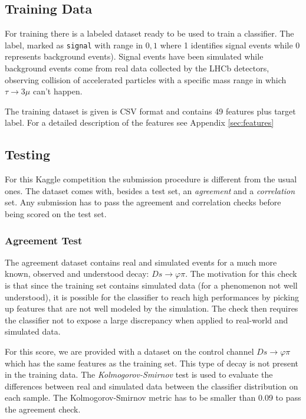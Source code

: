 \documentclass[conference]{IEEEtran}
\begin{document}
\subsection{Training Data}
For training there is a labeled dataset ready to be used to train a classifier.
The label, marked as \texttt{signal} with range in ${0,1}$ where 1 identifies
signal events while 0 represents background events). Signal events have been
simulated while background events come from real data collected by the LHCb
detectors, observing collision of accelerated particles with a specific mass
range in which $\tau \rightarrow 3\mu$ can't happen.

The training dataset is given is CSV format and contains 49 features plus target
label. For a detailed description of the features see Appendix \ref{sec:features}

\subsection{Testing}
For this Kaggle competition the submission procedure is different from the usual
ones. The dataset comes with, besides a test set, an \textit{agreement} and a
\textit{correlation} set. Any submission has to pass the agreement and
correlation checks before being scored on the test set.

\subsubsection{Agreement Test}
\label{sec:agreement}
The agreement dataset contains real and simulated events for a much more known,
observed and understood decay: $Ds \rightarrow \varphi\pi$. The motivation for
this check is that since the training set contains simulated data (for a
phenomenon not well understood), it is possible for the classifier to reach high
performances by picking up features that are not well modeled by the simulation.
The check then requires the classifier not to expose a large discrepancy when
applied to real-world and simulated data.

For this score, we are provided with a dataset on the control channel $Ds
\rightarrow \varphi\pi$ which has the same features as the training set. This
type of decay is not present in the training data. The
\textit{Kolmogorov-Smirnov} test is used to evaluate the differences between
real and simulated data between the classifier distribution on each sample.
The Kolmogorov-Smirnov metric has to be smaller than 0.09 to pass the agreement
check.
\end{document}
